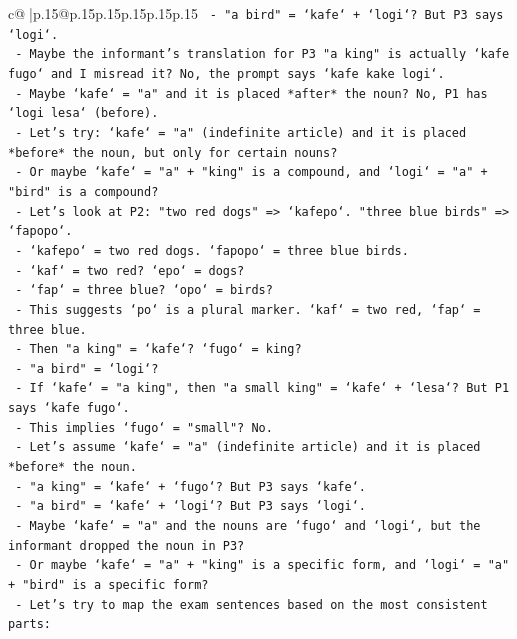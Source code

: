 \documentclass{article}
\begin{document}
{\begin{supertabular}{c@{$\;$}|p{.15\linewidth}@{}p{.15\linewidth}p{.15\linewidth}p{.15\linewidth}p{.15\linewidth}p{.15\linewidth}}
{{{\texttt{            {-} "a bird" = `kafe` + `logi`? But P3 says `logi`.} \\
\texttt{          {-} Maybe the informant's translation for P3 "a king" is actually `kafe fugo` and I misread it? No, the prompt says `kafe kake logi`.} \\
\texttt{          {-} Maybe `kafe` = "a" and it is placed *after* the noun? No, P1 has `logi lesa` (before).} \\
\texttt{          {-} Let's try: `kafe` = "a" (indefinite article) and it is placed *before* the noun, but only for certain nouns?} \\
\texttt{          {-} Or maybe `kafe` = "a" + "king" is a compound, and `logi` = "a" + "bird" is a compound?} \\
\texttt{          {-} Let's look at P2: "two red dogs" => `kafepo`. "three blue birds" => `fapopo`.} \\
\texttt{            {-} `kafepo` = two red dogs. `fapopo` = three blue birds.} \\
\texttt{            {-} `kaf` = two red? `epo` = dogs?} \\
\texttt{            {-} `fap` = three blue? `opo` = birds?} \\
\texttt{            {-} This suggests `po` is a plural marker. `kaf` = two red, `fap` = three blue.} \\
\texttt{            {-} Then "a king" = `kafe`? `fugo` = king?} \\
\texttt{            {-} "a bird" = `logi`?} \\
\texttt{            {-} If `kafe` = "a king", then "a small king" = `kafe` + `lesa`? But P1 says `kafe fugo`.} \\
\texttt{            {-} This implies `fugo` = "small"? No.} \\
\texttt{            {-} Let's assume `kafe` = "a" (indefinite article) and it is placed *before* the noun.} \\
\texttt{              {-} "a king" = `kafe` + `fugo`? But P3 says `kafe`.} \\
\texttt{              {-} "a bird" = `kafe` + `logi`? But P3 says `logi`.} \\
\texttt{            {-} Maybe `kafe` = "a" and the nouns are `fugo` and `logi`, but the informant dropped the noun in P3?} \\
\texttt{            {-} Or maybe `kafe` = "a" + "king" is a specific form, and `logi` = "a" + "bird" is a specific form?} \\
\texttt{            {-} Let's try to map the exam sentences based on the most consistent parts:} \\
}}}
\end{supertabular}}
\end{document}
